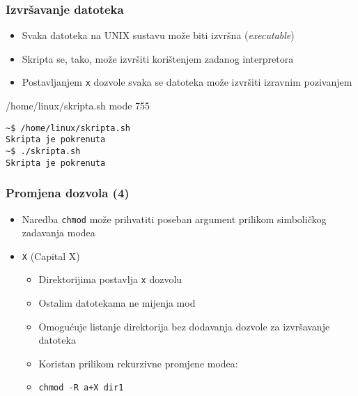 \documentclass[table,usenames,dvipsnames]{beamer}
\newcommand{\shell}[1]{\texttt{#1}}
\begin{document}
\begin{frame}[fragile]
\frametitle{Izvršavanje datoteka}
\begin{itemize}
	\item Svaka datoteka na UNIX sustavu može biti izvršna (\textit{executable})
	\item Skripta se, tako, može izvršiti korištenjem zadanog interpretora
\end{itemize}
\begin{itemize}
	\item Postavljanjem \shell{x} dozvole svaka se datoteka može izvršiti izravnim pozivanjem
\end{itemize}
\vfill
\begin{block}{/home/linux/skripta.sh \hfill mode 755}
	\makeset
\end{block}
\vfill
\begin{Verbatim}[fontsize=\footnotesize]
~$ /home/linux/skripta.sh
Skripta je pokrenuta
~$ ./skripta.sh
Skripta je pokrenuta
\end{Verbatim}
\end{frame}


\begin{frame}
	\frametitle{Promjena dozvola (4)}
\begin{itemize}
	\item Naredba \shell{chmod} može prihvatiti poseban argument prilikom simboličkog zadavanja modea
\end{itemize}
\begin{itemize}
	\item[] \shell{X} (Capital X)
	 \begin{itemize}
	 	\item Direktorijima postavlja \shell{x} dozvolu
	 	\item Ostalim datotekama ne mijenja mod
	 	\item Omogućuje listanje direktorija bez dodavanja dozvole za izvršavanje datoteka
	 	\item Koristan prilikom rekurzivne promjene modea:
	 	\item[] \hspace{1em} \shell{chmod -R a+X dir1}
	 \end{itemize}
\end{itemize}
\end{frame}
\end{document}
